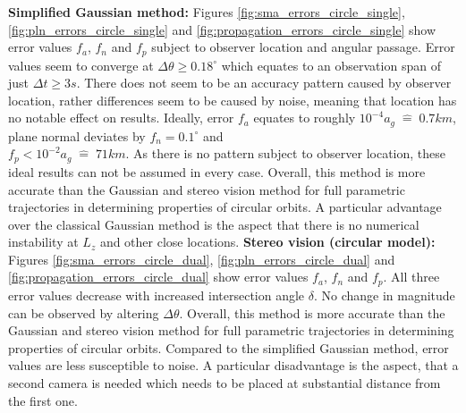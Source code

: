 \documentclass[10pt,a4paper]{article}
\begin{document}
	\textbf{Simplified Gaussian method:}\newline
	Figures \ref{fig:sma_errors_circle_single}, \ref{fig:pln_errors_circle_single} and \ref{fig:propagation_errors_circle_single} show error values $f_a$, $f_n$ and $f_p$ subject to observer location and angular passage. Error values seem to converge at $\Delta \theta \geq 0.18^\circ$ which equates to an observation span of just $\Delta t \geq 3s$. There does not seem to be an accuracy pattern caused by observer location, rather differences seem to be caused by noise, meaning that location has no notable effect on results. Ideally, error $f_a$ equates to roughly $10^{-4}a_g \;\widehat{=}\; 0.7km$, plane normal deviates by $f_n=0.1^\circ$ and \\ $f_p < 10^{-2}a_g \;\widehat{=}\; 71km$. As there is no pattern subject to observer location, these ideal results can not be assumed in every case.\newline
	Overall, this method is more accurate than the Gaussian and stereo vision method for full parametric trajectories in determining properties of circular orbits. A particular advantage over the classical Gaussian method is the aspect that there is no numerical instability at $L_z$ and other close locations.
	\newline\newline
	\textbf{Stereo vision (circular model):}\newline
	Figures \ref{fig:sma_errors_circle_dual}, \ref{fig:pln_errors_circle_dual} and \ref{fig:propagation_errors_circle_dual} show error values $f_a$, $f_n$ and $f_p$. All three error values decrease with increased intersection angle $\delta$. No change in magnitude can be observed by altering $\Delta \theta$.\newline
	Overall, this method is more accurate than the Gaussian and stereo vision method for full parametric trajectories in determining properties of circular orbits. Compared to the simplified Gaussian method, error values are less susceptible to noise. A particular disadvantage is the aspect, that a second camera is needed which needs to be placed at substantial distance from the first one.
	
\end{document}
